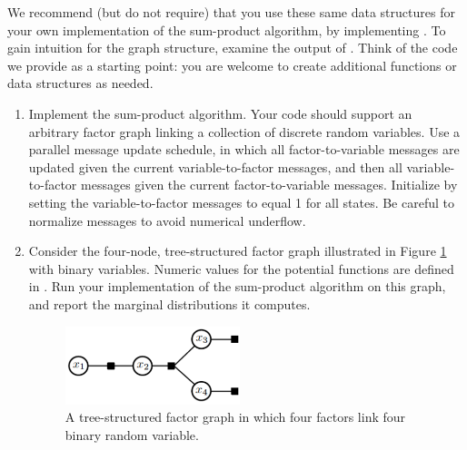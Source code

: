 \documentclass{article}
\begin{document}
\begin{enumerate}
We recommend (but do not require) that you use these same data structures for your own implementation of the sum-product algorithm, by implementing . To gain intuition for the graph structure, examine the output of . Think of the code we provide as a starting point: you are welcome to create additional functions or data structures as needed. 

\begin{enumerate}
\item Implement the sum-product algorithm. Your code should support an arbitrary factor graph linking a collection of discrete random variables. Use a parallel message update schedule,
in which all factor-to-variable messages are updated given the current variable-to-factor messages, and then all variable-to-factor messages given the current factor-to-variable
messages. Initialize by setting the variable-to-factor messages to equal 1 for all states.
Be careful to normalize messages to avoid numerical underflow.


\item Consider the four-node, tree-structured factor graph illustrated in Figure \ref{fig:tree} with binary variables. Numeric values for the potential functions are defined in . Run your implementation of the sum-product algorithm on this graph, and report the marginal distributions it computes. 
\begin{figure}[h]
\centering
\includegraphics[width=2in]{brown_hw1}
\caption{A tree-structured factor graph in which four factors link four binary random variable.}
\label{fig:tree}
\end{figure}
\end {enumerate}

\end{enumerate}
\end{document}
